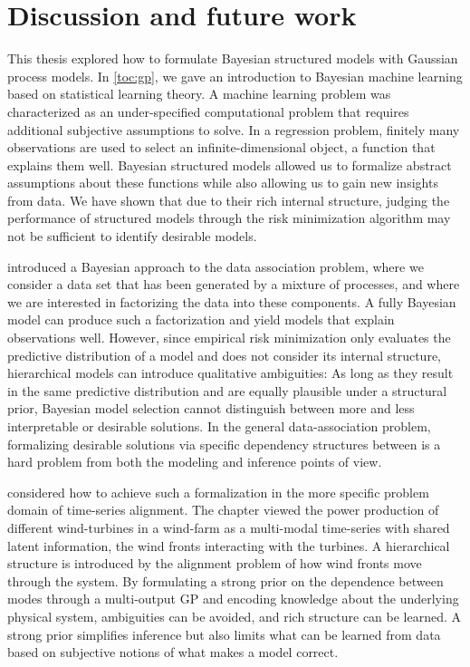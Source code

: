 \chapter{Discussion and future work}
\label{toc:discussion}
This thesis explored how to formulate Bayesian structured models with Gaussian process models.
In \cref{toc:gp}, we gave an introduction to Bayesian machine learning based on statistical learning theory.
A machine learning problem was characterized as an under-specified computational problem that requires additional subjective assumptions to solve.
In a regression problem, finitely many observations are used to select an infinite-dimensional object, a function that explains them well.
Bayesian structured models allowed us to formalize abstract assumptions about these functions while also allowing us to gain new insights from data.
We have shown that due to their rich internal structure, judging the performance of structured models through the risk minimization algorithm may not be sufficient to identify desirable models.

 introduced a Bayesian approach to the data association problem, where we consider a data set that has been generated by a mixture of processes, and where we are interested in factorizing the data into these components.
A fully Bayesian model can produce such a factorization and yield models that explain observations well.
However, since empirical risk minimization only evaluates the predictive distribution of a model and does not consider its internal structure, hierarchical models can introduce qualitative ambiguities:
As long as they result in the same predictive distribution and are equally plausible under a structural prior, Bayesian model selection cannot distinguish between more and less interpretable or desirable solutions.
In the general data-association problem, formalizing desirable solutions via specific dependency structures between is a hard problem from both the modeling and inference points of view.

 considered how to achieve such a formalization in the more specific problem domain of time-series alignment.
The chapter viewed the power production of different wind-turbines in a wind-farm as a multi-modal time-series with shared latent information, the wind fronts interacting with the turbines.
A hierarchical structure is introduced by the alignment problem of how wind fronts move through the system.
By formulating a strong prior on the dependence between modes through a multi-output GP and encoding knowledge about the underlying physical system, ambiguities can be avoided, and rich structure can be learned.
A strong prior simplifies inference but also limits what can be learned from data based on subjective notions of what makes a model correct.

